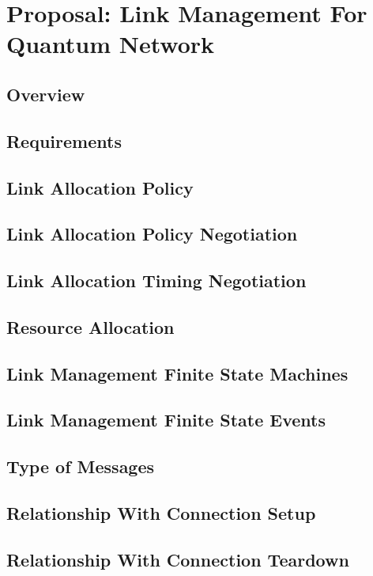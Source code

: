 \chapter{Proposal: Link Management For Quantum Network}
\label{proposal}

\section{Overview}
\section{Requirements}
\section{Link Allocation Policy}
\section{Link Allocation Policy Negotiation }
\section{Link Allocation Timing Negotiation }
\section{Resource Allocation }
\section{Link Management Finite State Machines}
\section{Link Management Finite State Events}
\section{Type of Messages}
\section{Relationship With Connection Setup}
\section{Relationship With Connection Teardown}

